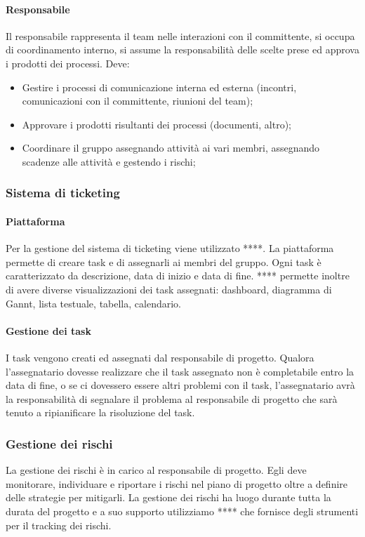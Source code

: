 \paragraph{Responsabile} \Spazio
Il responsabile rappresenta il team nelle interazioni con il committente, si occupa di coordinamento interno, si assume la responsabilità delle scelte prese ed approva i prodotti dei processi. Deve:
\begin{itemize} 
\item Gestire i processi di comunicazione interna ed esterna (incontri, comunicazioni con il committente, riunioni del team);
\item Approvare i prodotti risultanti dei processi (documenti, altro);
\item Coordinare il gruppo assegnando attività ai vari membri, assegnando scadenze alle attività e gestendo i rischi;
\end{itemize}

\subsubsection{Sistema di ticketing}
\paragraph{Piattaforma}
Per la gestione del sistema di ticketing viene utilizzato ****. La piattaforma permette
di creare task e di assegnarli ai membri del gruppo. Ogni task è caratterizzato da
descrizione, data di inizio e data di fine. **** permette inoltre di avere diverse visualizzazioni dei task assegnati: dashboard, diagramma di Gannt, lista testuale, tabella, calendario.

\paragraph{Gestione dei task}
I task vengono creati ed assegnati dal responsabile di progetto. Qualora l'assegnatario dovesse realizzare che il task assegnato non è completabile entro la data di fine, o se ci dovessero essere altri problemi con il task, l'assegnatario avrà la responsabilità di segnalare il problema al responsabile di progetto che sarà tenuto a ripianificare la risoluzione del task.

\subsubsection{Gestione dei rischi}
La gestione dei rischi è in carico al responsabile di progetto. Egli deve monitorare, 
individuare e riportare i rischi nel piano di progetto oltre a definire delle strategie per mitigarli. La gestione dei rischi ha luogo durante tutta la durata del progetto e a suo supporto utilizziamo **** che fornisce degli strumenti per il tracking dei rischi.


